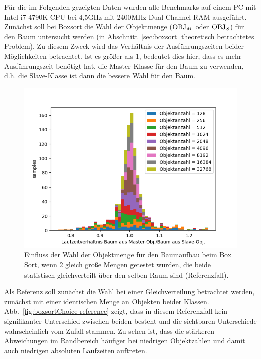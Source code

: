 Für die im Folgenden gezeigten Daten wurden alle Benchmarks auf einem PC mit Intel i7-4790K CPU bei 4,5GHz mit 2400MHz Dual-Channel RAM ausgeführt.\\
Zunächst soll bei Boxsort die Wahl der Objektmenge ($\operatorname{OBJ}_M$ oder $\operatorname{OBJ}_S$) für den Baum untersucht werden (in Abschnitt~\ref{sec:boxsort} theoretisch betrachtetes Problem). Zu diesem Zweck wird das Verhältnis der Ausführungszeiten beider Möglichkeiten betrachtet. Ist es größer als 1, bedeutet dies hier, dass es mehr Ausführungszeit benötigt hat, die Master-Klasse für den Baum zu verwenden, d.h. die Slave-Klasse ist dann die bessere Wahl für den Baum.\\

\begin{figure}
    \centering
    \includegraphics[width=1.0\textwidth]{./res/boxsortChoice-reference.png}
    \caption{
    Einfluss der Wahl der Objektmenge für den Baumaufbau beim Box Sort, wenn 2 gleich große Mengen getestet wurden, die beide statistisch gleichverteilt über den selben Raum sind (Referenzfall).}
    \label{fig:boxsortCoice-reference}
\end{figure}

Als Referenz soll zunächst die Wahl bei einer Gleichverteilung betrachtet werden, zunächst mit einer identischen Menge an Objekten beider Klassen. Abb.~\ref{fig:boxsortChoice-reference} zeigt, dass in diesem Referenzfall kein signifikanter Unterschied zwischen beiden besteht und die sichtbaren Unterschiede wahrscheinlich vom Zufall stammen. Zu sehen ist, dass die stärkeren Abweichungen im Randbereich häufiger bei niedrigen Objektzahlen und damit auch niedrigen absoluten Laufzeiten auftreten.\\


